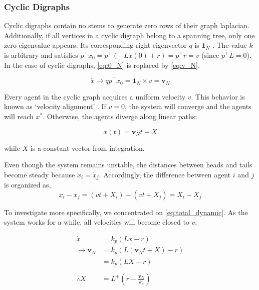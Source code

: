 \documentclass[letterpaper, 10 pt, conference]{ieeeconf}  %
\begin{document}
\subsubsection{Cyclic Digraphs}

Cyclic digraphs contain no stems to generate zero rows of their graph laplacian. Additionally, if all vertices in a cyclic digraph belong to a spanning tree, only one zero eigenvalue appears. Its corresponding right eigenvector \( q \) is \( \mathbf{1}_N \) \cite{olfati-saber_consensus_2007}. The value \( k \) is arbitrary and satisfies \( p^\top \dot{x}_0 = p^\top (-Lx(0) + r) = p^\top r = v \) (since \( p^\top L = 0 \)). In the case of cyclic digraphs, \eqref{eq:0_N} is replaced by \eqref{eq:v_N}.

\begin{equation}\label{eq:v_N}
    \dot{x} \rightarrow qp^\top \dot{x}_0 = \mathbf{1}_N \times v = \mathbf{v}_N
\end{equation}

\noindent Every agent in the cyclic graph acquires a uniform velocity \( v \). This behavior is known as `velocity alignment' \cite{dimarogonas_connection_2008}. If \( v = 0 \), the system will converge and the agents will reach \( x^* \). Otherwise, the agents diverge along linear paths:

\[
x(t) = \mathbf{v}_N t + X 
\]

\noindent while \( X \) is a constant vector from integration.


Even though the system remains unstable, the distances between heads and tails become steady because \( \dot{x}_i = \dot{x}_j \). Accordingly, the difference between agent $i$ and $j$ is organized as,
\[
x_i - x_j = (vt + X_i) - (vt +X_j) = X_i-X_j
\]

To investigate more specifically, we concentrated on \eqref{eq:total_dynamic}. As the system works for a while, all velocities will become closed to \(v\). 

\begin{equation}\label{eq:findX}
\begin{split}
    \dot{x} &= k_p(Lx - r) \\
   \rightarrow  \mathbf{v}_N &= k_p(L(\mathbf{v}_Nt + X) - r) \\
           &= k_p(LX - r)  \\ \\
 \therefore X &= L^+ (r - \frac{\mathbf{v}_N}{k_p})
\end{split}
\end{equation}
\end{document}
